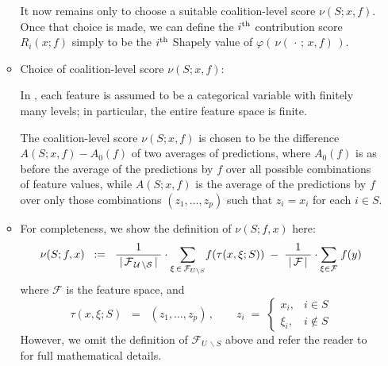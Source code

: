 \begin{itemize}
\begin{itemize}
		It now remains only to choose a suitable coalition-level score $\nu(S;x,f)$.
		Once that choice is made, we can define the $i^{\textnormal{th}}$ contribution score
		$R_{i}(x;f)$ simply to be the $i^{\textnormal{th}}$ Shapely value of
		$\varphi\left(\,\nu(\,\cdot\,;\,x,f)\,\right)$.

	\item
		Choice of coalition-level score $\nu(S;x,f)$:
		
		In \cite{Strumbelj2010},
		each feature is assumed to be a categorical variable
		with finitely many levels;
		in particular, the entire feature space is finite.

		
		The coalition-level score $\nu(S;x,f)$ is chosen to be the difference
		$A(S;x,f) - A_{0}(f)$
		of two averages of predictions, where $A_{0}(f)$ is as before
		the average of the predictions by $f$ over all possible combinations of feature values,
		while $A(S;x,f)$ is the average of the predictions by $f$ over only those combinations
		$(z_{1},\ldots,z_{p})$ such that $z_{i} = x_{i}$ for each $i \in S$.

	\item
		For completeness, we show the definition of $\nu(S;f,x)$ here:
		\begin{equation*}
		\nu(S;f,x)
		\;\; := \;\;
			\dfrac{1}{{\color{white}.}\vert\,\mathcal{F_{\,U\,\backslash S}}\,\vert{\color{white}.}}
			\cdot
			\underset{\xi\,\in\,\mathcal{F}_{U \backslash S}}{\sum}f(\tau(x,\xi;S))
			\; - \;
			\dfrac{1}{{\color{white}.}\vert\,\mathcal{F}\,\vert{\color{white}.}}
			\cdot
			\underset{\xi \in \mathcal{F}}{\sum}\;f(y)
		\end{equation*}
		where $\mathcal{F}$ is the feature space, and
		\begin{equation*}
		\tau(x,\xi;S) \;\; = \;\; (z_{1},\ldots,z_{p})\,,
		\quad\quad
		z_{i}
		\; = \;
			\left\{\begin{array}{cl}
			x_{i}, & i \in S
			\\
			\xi_{i}, & i \notin S
			\end{array}\right.
		\end{equation*}
		However, we omit the definition of $\mathcal{F}_{U\,\backslash S}$ above and
		refer the reader to \cite{Strumbelj2010} for full mathematical details.


\end{itemize}
\end{itemize}
